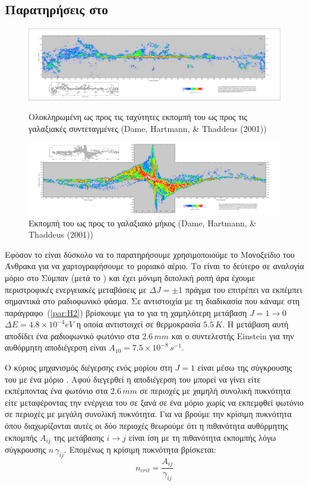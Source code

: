 \documentclass[a4paper,12pt]{memoir}
\begin{document}
\subsection{Παρατηρήσεις στο  }
\label{par:criticaldensity}
\begin{figure}[h]
  \label{fig:CO-galaxy}
	\centering
	\includegraphics[width=17cm]{images/CO_long_lat.pdf}
	\caption{Ολοκληρωμένη ως προς τις ταχύτητες εκπομπή του  ως προς τις γαλαξιακές συντεταγμένες (Dame, Hartmann, \& Thaddeus (2001))}
	
		\centering
		\includegraphics[width=17cm]{images/CO_long_vel.pdf}
		\caption{Εκπομπή του  ως προς το γαλαξιακό μήκος (Dame, Hartmann, \& Thaddeus (2001))}
\end{figure}

Εφόσον το  είναι δύσκολο να το παρατηρήσουμε χρησιμοποιούμε το Μονοξείδιο του Άνθρακα  για να χαρτογραφήσουμε το μοριακό αέριο. Το  είναι το δεύτερο σε αναλογία μόριο στο Σύμπαν (μετά το ) και έχει μόνιμη διπολική ροπή άρα έχουμε περιστροφικές ενεργειακές μεταβάσεις με $\Delta J=\pm 1$ πράγμα του επιτρέπει να εκπέμπει σημαντικά στο ραδιοφωνικό φάσμα. 
Σε αντιστοιχία με τη διαδικασία που κάναμε στη παράγραφο~(\ref{par:H2}) βρίσκουμε για το  για τη χαμηλότερη μετάβαση $J=1\rightarrow 0$ $\Delta E=4.8\times 10^{-4} eV$ η οποία αντιστοιχεί σε θερμοκρασία $5.5 \, K$. Η μετάβαση αυτή αποδίδει ένα ραδιοφωνικό φωτόνιο στα $2.6 \, mm$ και ο συντελεστής Einstein για την αυθόρμητη αποδιέγερση είναι $A_{10}=7.5\times 10^{-8} \, s^{-1}$.

Ο κύριος μηχανισμός διέγερσης ενός μορίου  στη $J=1$ είναι μέσω της σύγκρουσης του με ένα μόριο . Αφού διεγερθεί η αποδιέγερση του μπορεί να γίνει είτε εκπέμποντας ένα φωτόνιο στα $2.6 \, mm$ σε περιοχές με χαμηλή συνολική πυκνότητα είτε μεταφέροντας την ενέργεια του σε ξανά σε ένα μόριο  χωρίς να εκπεμφθεί φωτόνιο σε περιοχές με μεγάλη συνολική πυκνότητα. Για να βρούμε την κρίσιμη πυκνότητα όπου διαχωρίζονται αυτές οι δύο περιοχές θεωρούμε ότι η πιθανότητα αυθόρμητης εκπομπής $A_{ij}$ της μετάβασης $i\rightarrow j$ είναι ίση με τη πιθανότητα εκπομπής λόγω σύγκρουσης $n \, \gamma _{ij}$. Επομένως η κρίσιμη πυκνότητα βρίσκεται:
\begin{equation}
n_{crit}=\frac{A_{ij}}{\gamma _{ij}}
\end{equation} 
\end{document}
